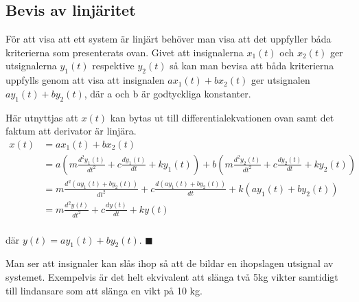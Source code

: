 \subsection{Bevis av linjäritet}
För att visa att ett system är linjärt behöver man visa att det uppfyller båda kriterierna som presenterats ovan. 
Givet att insignalerna $x_1(t)$ och $x_2(t)$ ger utsignalerna $y_1(t)$ respektive $y_2(t)$ så kan man bevisa att båda kriterierna uppfylls  genom att visa att insignalen $ax_1(t) + bx_2(t)$ ger utsignalen $ay_1(t) + by_2(t)$, där a och b är godtyckliga konstanter.

Här utnyttjas att $x(t)$  kan bytas ut till differentialekvationen ovan samt det faktum att derivator är linjära.
\begin{equation*} \label{eq1.6a}
\begin{split}
x(t)
&=ax_1(t)+bx_2(t)\\
&=a\left(m\frac{d^2y_1(t)}{dt^2}+c\frac{dy_1(t)}{dt}+ky_1(t)\right)+b\left(m\frac{d^2y_2(t)}{dt^2}+c\frac{dy_2(t)}{dt}+ky_2(t)\right)\\
&=m\frac{d^2(ay_1(t)+by_2(t))}{dt^2}+c\frac{d(ay_1(t)+by_2(t))}{dt}+k(ay_1(t)+by_2(t))\\
&=m\frac{d^2y(t)}{dt^2}+c\frac{dy(t)}{dt}+ky(t)\\
\end{split}
\end{equation*} 


där $y(t)=ay_1(t)+by_2(t)$. $\blacksquare$

Man ser att insignaler kan slås ihop så att de bildar en ihopslagen utsignal av systemet. Exempelvis är det helt ekvivalent att slänga två 5kg vikter samtidigt till lindansare som att slänga en vikt på 10 kg.
 

